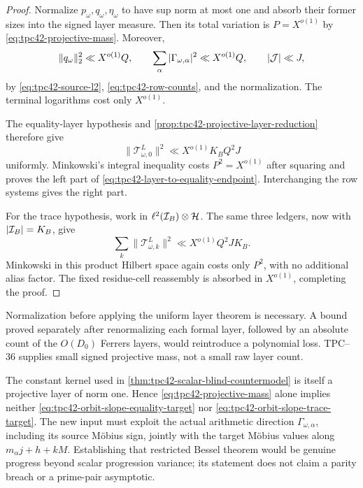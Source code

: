 \begin{proof}
Normalize \(p_\omega,q_\omega,\eta_\omega\) to have sup norm at most one
and absorb their former sizes into the signed layer measure.  Then its
total variation is \(P=X^{o(1)}\) by
\eqref{eq:tpc42-projective-mass}.  Moreover,
\begin{equation}
 \|q_\omega\|_2^2\ll X^{o(1)}Q,
 \qquad
 \sum_\alpha|\Gamma_{\omega,\alpha}|^2
 \ll X^{o(1)}Q,
 \qquad
 |\mathcal J|\ll J,
 \label{eq:tpc42-layer-endpoint-ledgers}
\end{equation}
by \eqref{eq:tpc42-source-l2}, \eqref{eq:tpc42-row-counts}, and the
normalization.  The terminal logarithms cost only \(X^{o(1)}\).

The equality-layer hypothesis and
\cref{prop:tpc42-projective-layer-reduction} therefore give
\begin{equation}
 \|\mathscr T_{\omega,0}^L\|^2
 \ll X^{o(1)}K_BQ^2J
 \label{eq:tpc42-one-layer-equality-absolute}
\end{equation}
uniformly.  Minkowski's integral inequality costs \(P^2=X^{o(1)}\)
after squaring and proves the left part of
\eqref{eq:tpc42-layer-to-equality-endpoint}.  Interchanging the row
systems gives the right part.

For the trace hypothesis, work in
\(\ell^2(\mathcal I_B)\otimes\mathcal H\).  The same three ledgers, now with
\(|\mathcal I_B|=K_B\), give
\begin{equation}
 \sum_k\|\mathscr T_{\omega,k}^L\|^2
 \ll X^{o(1)}Q^2JK_B.
 \label{eq:tpc42-one-layer-trace-absolute}
\end{equation}
Minkowski in this product Hilbert space again costs only \(P^2\), with no
additional alias factor.  The fixed residue-cell reassembly is absorbed
in \(X^{o(1)}\), completing the proof.
\end{proof}

Normalization before applying the uniform layer theorem is necessary.  A
bound proved separately after renormalizing each formal layer, followed
by an absolute count of the
\(O(D_0)\) Ferrers layers, would reintroduce a polynomial loss.  TPC--36
supplies small signed projective mass, not a small raw layer count.

\begin{remark}
\label{rem:tpc42-projective-boundary}
The constant kernel used in
\cref{thm:tpc42-scalar-blind-countermodel} is itself a projective layer of
norm one.  Hence \eqref{eq:tpc42-projective-mass} alone implies neither
\eqref{eq:tpc42-orbit-slope-equality-target} nor
\eqref{eq:tpc42-orbit-slope-trace-target}.  The new input must exploit the
actual arithmetic direction \(\Gamma_{\omega,\alpha}\), including its
source M\"obius sign, jointly with the target M\"obius values along
\(m_\alpha j+h+kM\).  Establishing that restricted Bessel theorem would
be genuine progress beyond scalar progression variance; its statement
does not claim a parity breach or a prime-pair asymptotic.
\end{remark}
